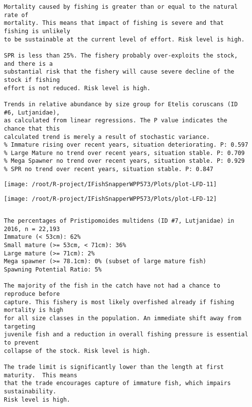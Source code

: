 \documentclass{report}\usepackage[]{graphicx}\usepackage[]{color}
\makeatletter
\def\maxwidth{ %
  \ifdim\Gin@nat@width>\linewidth
    \linewidth
  \else
    \Gin@nat@width
  \fi
}
\newenvironment{kframe}{%
 \def\at@end@of@kframe{}%
 \ifinner\ifhmode%
  \def\at@end@of@kframe{\end{minipage}}%
  \begin{minipage}{\columnwidth}%
 \fi\fi%
 \def\FrameCommand##1{\hskip\@totalleftmargin \hskip-\fboxsep
 \colorbox{shadecolor}{##1}\hskip-\fboxsep
     \hskip-\linewidth \hskip-\@totalleftmargin \hskip\columnwidth}%
 \MakeFramed {\advance\hsize-\width
   \@totalleftmargin\z@ \linewidth\hsize
   \@setminipage}}%
 {\par\unskip\endMakeFramed%
 \at@end@of@kframe}
\newenvironment{knitrout}{}{} %
\makeatother
\begin{document}
\begin{knitrout}
\begin{kframe}
\begin{verbatim}
Mortality caused by fishing is greater than or equal to the natural rate of
mortality. This means that impact of fishing is severe and that fishing is unlikely
to be sustainable at the current level of effort. Risk level is high.
 
SPR is less than 25%. The fishery probably over-exploits the stock, and there is a
substantial risk that the fishery will cause severe decline of the stock if fishing
effort is not reduced. Risk level is high.
 
Trends in relative abundance by size group for Etelis coruscans (ID #6, Lutjanidae),
as calculated from linear regressions. The P value indicates the chance that this
calculated trend is merely a result of stochastic variance.
% Immature rising over recent years, situation deteriorating. P: 0.597
% Large Mature no trend over recent years, situation stable. P: 0.709
% Mega Spawner no trend over recent years, situation stable. P: 0.929
% SPR no trend over recent years, situation stable. P: 0.847
\end{verbatim}
\end{kframe}
\texttt{[image: /root/R-project/IFishSnapperWPP573/Plots/plot-LFD-11]} 

\texttt{[image: /root/R-project/IFishSnapperWPP573/Plots/plot-LFD-12]} 
\begin{kframe}\begin{verbatim}
\end{verbatim}
\end{kframe}
\clearpage
\newpage
\begin{kframe}\begin{verbatim}The percentages of Pristipomoides multidens (ID #7, Lutjanidae) in 2016, n = 22,193
Immature (< 53cm): 62%
Small mature (>= 53cm, < 71cm): 36%
Large mature (>= 71cm): 2%
Mega spawner (>= 78.1cm): 0% (subset of large mature fish)
Spawning Potential Ratio: 5%
 
The majority of the fish in the catch have not had a chance to reproduce before
capture. This fishery is most likely overfished already if fishing mortality is high
for all size classes in the population. An immediate shift away from targeting
juvenile fish and a reduction in overall fishing pressure is essential to prevent
collapse of the stock. Risk level is high.

The trade limit is significantly lower than the length at first maturity.  This means
that the trade encourages capture of immature fish, which impairs sustainability.
Risk level is high.


\end{verbatim}
\end{kframe}
\end{knitrout}
\end{document}
